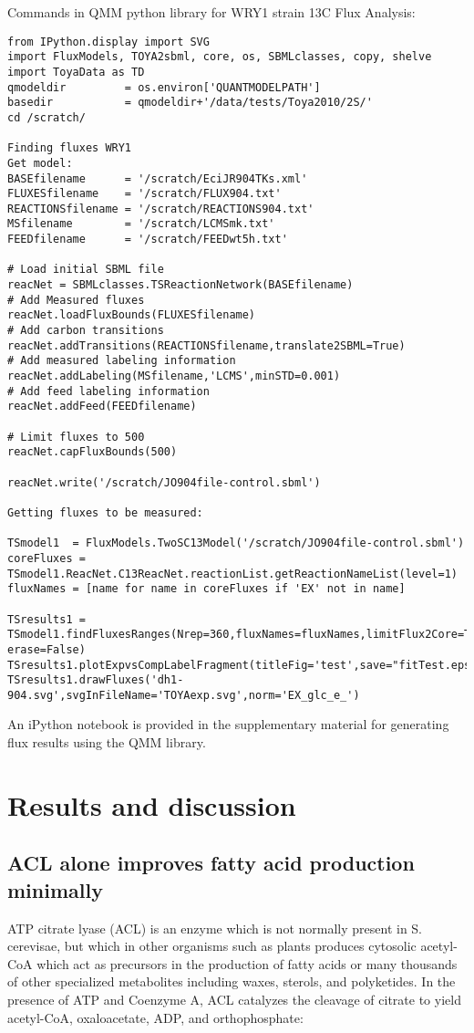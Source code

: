 \documentclass{bmcart}
\begin{document}
Commands in QMM python library for WRY1 strain 13C Flux Analysis:
\begin{lstlisting}
from IPython.display import SVG
import FluxModels, TOYA2sbml, core, os, SBMLclasses, copy, shelve
import ToyaData as TD
qmodeldir         = os.environ['QUANTMODELPATH']
basedir           = qmodeldir+'/data/tests/Toya2010/2S/'
cd /scratch/

Finding fluxes WRY1
Get model:
BASEfilename      = '/scratch/EciJR904TKs.xml'
FLUXESfilename    = '/scratch/FLUX904.txt'
REACTIONSfilename = '/scratch/REACTIONS904.txt'
MSfilename        = '/scratch/LCMSmk.txt'
FEEDfilename      = '/scratch/FEEDwt5h.txt'

# Load initial SBML file
reacNet = SBMLclasses.TSReactionNetwork(BASEfilename)    
# Add Measured fluxes
reacNet.loadFluxBounds(FLUXESfilename)
# Add carbon transitions
reacNet.addTransitions(REACTIONSfilename,translate2SBML=True)
# Add measured labeling information
reacNet.addLabeling(MSfilename,'LCMS',minSTD=0.001)
# Add feed labeling information
reacNet.addFeed(FEEDfilename)
 
# Limit fluxes to 500       
reacNet.capFluxBounds(500)
    
reacNet.write('/scratch/JO904file-control.sbml')

Getting fluxes to be measured:

TSmodel1  = FluxModels.TwoSC13Model('/scratch/JO904file-control.sbml')       
coreFluxes = TSmodel1.ReacNet.C13ReacNet.reactionList.getReactionNameList(level=1)
fluxNames = [name for name in coreFluxes if 'EX' not in name]    

TSresults1 = TSmodel1.findFluxesRanges(Nrep=360,fluxNames=fluxNames,limitFlux2Core=True, erase=False) 
TSresults1.plotExpvsCompLabelFragment(titleFig='test',save="fitTest.eps")
TSresults1.drawFluxes('dh1-904.svg',svgInFileName='TOYAexp.svg',norm='EX_glc_e_')
\end{lstlisting}

An  iPython notebook is provided in the supplementary material for generating flux results using the QMM library.


\section*{Results and discussion}
\subsection*{ACL alone improves fatty acid production minimally}
ATP citrate lyase (ACL) is an enzyme which is not normally present in S. cerevisae, but which in other organisms such as plants produces cytosolic acetyl-CoA which act as precursors in the production of fatty acids or many thousands of other specialized metabolites including waxes, sterols, and polyketides. In the presence of ATP and Coenzyme A, ACL catalyzes the cleavage of citrate to yield acetyl-CoA, oxaloacetate, ADP, and orthophosphate:
\end{document}
